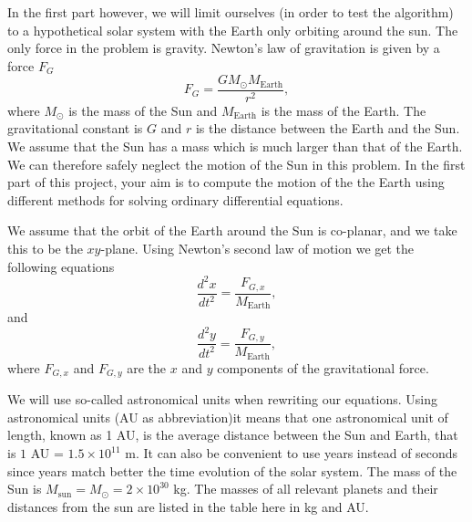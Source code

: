 \documentclass[%
oneside,                 %
final,                   %
10pt]{article}
\begin{document}
In the first part however, we will limit ourselves (in order to test the algorithm) 
to a hypothetical solar system
with the Earth only orbiting around the sun.
The only force in the problem is gravity. Newton's law of gravitation  is given by a force $F_G$
\[
F_G=\frac{GM_{\odot}M_{\mathrm{Earth}}}{r^2},
\]
where $M_{\odot}$ is the mass of the Sun and $M_{\mathrm{Earth}}$ is the mass of the Earth. The gravitational constant is $G$ and $r$ is the distance between the Earth and the Sun.
We assume that the Sun has a mass which is much larger 
than that of the Earth. We can therefore safely neglect the 
motion of the Sun in this problem.  In the first part of this project, your aim is to compute the motion
of the the Earth using different methods for solving ordinary differential equations.

We assume that the orbit of the Earth around the Sun 
is co-planar, and we take this to be the $xy$-plane.
Using Newton's second law of motion we get the following equations
\[
\frac{d^2x}{dt^2}=\frac{F_{G,x}}{M_{\mathrm{Earth}}},
\]
and 
\[
\frac{d^2y}{dt^2}=\frac{F_{G,y}}{M_{\mathrm{Earth}}},
\]
where $F_{G,x}$ and $F_{G,y}$ are the $x$ and $y$ components of the gravitational force. 

We will use so-called astronomical units when rewriting our equations. 
Using astronomical units (AU as abbreviation)it means that 
one astronomical unit of length, known as 1 AU, is the average distance between the Sun and Earth, that is
$1$ AU = $1.5\times 10^{11}$ m.  It can also be convenient to use years instead of seconds since years match
better the time evolution of the solar system. The mass of the Sun is $M_{\mathrm{sun}}=M_{\odot}=2\times 10^{30}$ kg. The masses of all relevant planets and their distances from the sun are listed in the table here in kg and AU.
\end{document}
